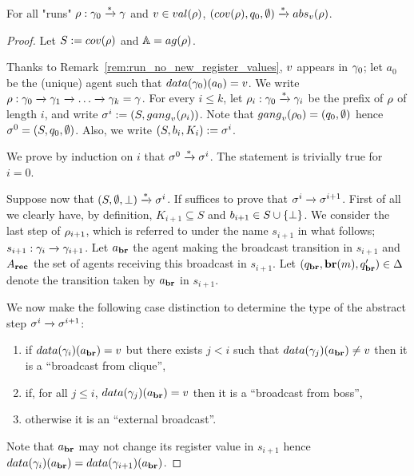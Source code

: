 \begin{lemma}
	\label{lem:proof_completeness_covset_constant}
	For all "runs" $\rho: \gamma_0 \xrightarrow{*} \gamma$ and $\aval \in \valsof{\run}$, $(\statesin{\run}, q_0, \emptyset) \step{*} \absproj{\aval}{\run}$. 
\end{lemma}

\begin{proof}
	Let $\covset := \statesin{\run}$ and $\agents = \agentsof{\run}$.
	
	Thanks to Remark~\ref{rem:run_no_new_register_values},  $v$ appears in $\gamma_0$; let $a_0$ be the (unique) agent such that $\data{\config_0}(a_0) = \aval$. We write $\rho : \gamma_0 \xrightarrow{} \gamma_1 \xrightarrow{} \dots \xrightarrow{} \gamma_k = \gamma$. For every $i \leq k$, let $\rho_i : \gamma_0 \xrightarrow{*} \gamma_i$ be the prefix of $\rho$ of length $i$, and write $\aconfig^i := (\covset, \gangof{\aval}{\run_i})$. Note that $\gangof{\aval}{\run_0} = (q_0, \emptyset)$ hence $\sigma^0 = (S, q_0, \emptyset)$. Also, we write $(\covset, \boss_i, \clique_i) := \aconfig^i$.
	
	We prove by induction on $i$ that $\sigma^0 \xrightarrow{*} \sigma^i$.
	The statement is trivially true for $i =0$. 
	
	Suppose now that $(S, \emptyset, \bot) \xrightarrow{*} \sigma^i$. 
	If suffices to prove that $\sigma^i \xrightarrow{} \sigma^{i+1}$. First of all we clearly have, by definition, $K_{i+1} \subseteq S$ and $\boss_{i+1}\in S\cup\set{\noboss}$. We consider the last step of $\rho_{i+1}$, which is referred to under the name $s_{i+1}$ in what follows; $s_{i+1}: \gamma_i \xrightarrow{} \gamma_{i+1}$. Let $a_{\textbf{br}}$ the agent making the broadcast transition in $s_{i+1}$ and $A_{\textbf{rec}}$ the set of agents receiving this broadcast in $s_{i+1}$. Let $(q_{\textbf{br}}, \textbf{br}(m), q_{\textbf{br}}') \in \Delta$ denote the transition taken by $a_{\textbf{br}}$ in $s_{i+1}$.
	
	We now make the following case distinction to determine the type of the abstract step $\sigma^i \xrightarrow{} \sigma^{i+1}$:
	\begin{enumerate}
		\item\label{proof_completeness:case_broadcast_clique} if $\data{\config_{i}}(\agentbr) = \aval$ but there exists $j<i$ such that $\data{\config_{j}}(\agentbr) \ne \aval$ then it is a ``broadcast from clique'',
		\item\label{proof_completeness:case_broadcast_boss} if, for all $j \leq i$, $\data{\config_j}(\agentbr) = \aval$ then it is a ``broadcast from boss'',
		\item\label{proof_completeness:case_external_broadcast} otherwise it is an ``external broadcast''. 
	\end{enumerate}
	Note that $a_{\textbf{br}}$ may not change its register value in $s_{i+1}$ hence $\data{\config_i}(\agentbr) = \data{\config_{i+1}}(\agentbr)$. 
	

\end{proof}
